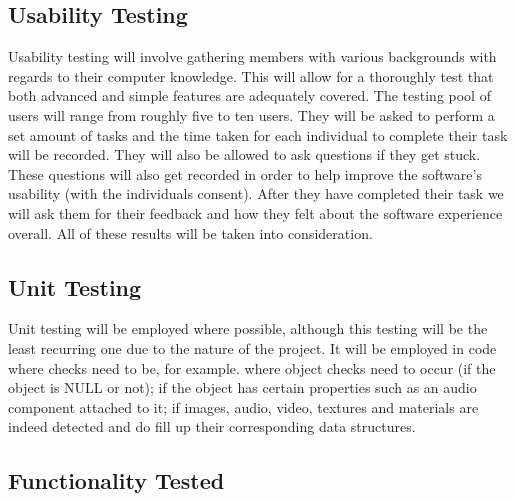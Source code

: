 	\subsection{Usability Testing}

	Usability testing will involve gathering members with various backgrounds with regards to their computer knowledge. This will allow for a thoroughly test that both
	advanced and simple features are adequately covered. The testing pool of users will range from roughly five to ten users. They will be asked to perform a set amount of
	tasks and the time taken for each individual to complete their task will be recorded. They will also be allowed to ask questions if they get stuck. These questions will
	also get recorded in order to help improve the software’s usability (with the individuals consent). After they have completed their task we will ask them for their
	feedback and how they felt about the software experience overall. All of these results will be taken into consideration.

	\subsection{Unit Testing}

	Unit testing will be employed where possible, although this testing will be the least recurring one due to the nature of the project. It will be employed in code
	where checks need to be, for example. where object checks need to occur (if the object is NULL or not); if the object has certain properties such as an audio
	component attached to it; if images, audio, video, textures and materials are indeed detected and do fill up their corresponding data structures.

	\subsection{Functionality Tested}

